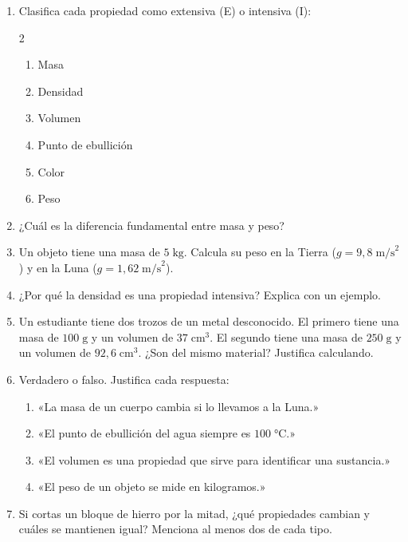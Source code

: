 \documentclass[12pt, a4paper]{article}
\begin{document}
\begin{enumerate}[leftmargin=*, resume]
  \item \facil{} Clasifica cada propiedad como extensiva (E) o intensiva (I):
  \begin{multicols}{2}
  \begin{enumerate}[label=\alph*)]
    \item Masa
    \item Densidad
    \item Volumen
    \item Punto de ebullición
    \item Color
    \item Peso
  \end{enumerate}
  \end{multicols}

  \item \facil{} ¿Cuál es la diferencia fundamental entre masa y peso?

  \item \facil{} Un objeto tiene una masa de $5\;\text{kg}$. Calcula su peso en la Tierra ($g = 9{,}8\;\text{m/s}^2$) y en la Luna ($g = 1{,}62\;\text{m/s}^2$).

  \item \facil{} ¿Por qué la densidad es una propiedad intensiva? Explica con un ejemplo.

  \item \medio{} Un estudiante tiene dos trozos de un metal desconocido. El primero tiene una masa de $100\;\text{g}$ y un volumen de $37\;\text{cm}^3$. El segundo tiene una masa de $250\;\text{g}$ y un volumen de $92{,}6\;\text{cm}^3$. ¿Son del mismo material? Justifica calculando.

  \item \medio{} Verdadero o falso. Justifica cada respuesta:
  \begin{enumerate}[label=\alph*)]
    \item «La masa de un cuerpo cambia si lo llevamos a la Luna.»
    \item «El punto de ebullición del agua siempre es $100\;°\text{C}$.»
    \item «El volumen es una propiedad que sirve para identificar una sustancia.»
    \item «El peso de un objeto se mide en kilogramos.»
  \end{enumerate}

  \item \medio{} Si cortas un bloque de hierro por la mitad, ¿qué propiedades cambian y cuáles se mantienen igual? Menciona al menos dos de cada tipo.


\end{enumerate}
\end{document}
